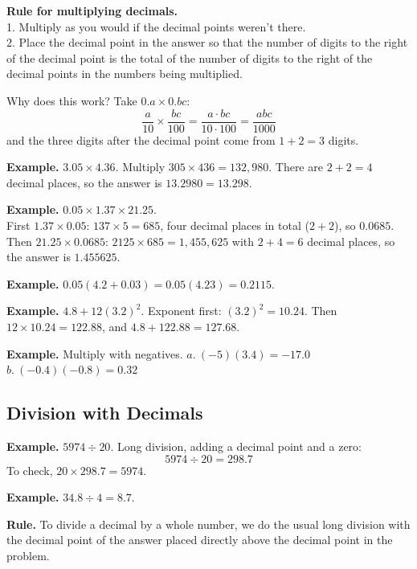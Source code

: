 \documentclass[letter]{article}
\newenvironment{keybox}
  {\begin{lrbox}{\keyboxsave}\begin{minipage}{\dimexpr\linewidth-2\fboxsep-2\fboxrule\relax}}
  {\end{minipage}\end{lrbox}\par\noindent\fbox{\usebox{\keyboxsave}}\par}
\begin{document}
\begin{keybox}
\textbf{Rule for multiplying decimals.}\\
1. Multiply as you would if the decimal points weren't there.\\
2. Place the decimal point in the answer so that the number of digits to the right of the decimal point is the total of the number of digits to the right of the decimal points in the numbers being multiplied.
\end{keybox}

Why does this work? Take $0.a\times0.bc$:
\[\frac a{10}\times\frac{bc}{100}=\frac{a\cdot bc}{10\cdot100}=\frac{abc}{1000}\]
and the three digits after the decimal point come from $1+2=3$ digits.

\textbf{Example.} $3.05\times4.36$. Multiply $305\times436=132{,}980$. There are $2+2=4$ decimal places, so the answer is $13.2980=13.298$.

\textbf{Example.} $0.05\times1.37\times21.25$.\\
First $1.37\times0.05$: $137\times5=685$, four decimal places in total ($2+2$), so $0.0685$.\\
Then $21.25\times0.0685$: $2125\times685=1{,}455{,}625$ with $2+4=6$ decimal places, so the answer is $1.455625$.

\textbf{Example.} $0.05(4.2+0.03)=0.05(4.23)=0.2115$.

\textbf{Example.} $4.8+12(3.2)^2$. Exponent first: $(3.2)^2=10.24$. Then $12\times10.24=122.88$, and $4.8+122.88=127.68$.

\textbf{Example.} Multiply with negatives. $a.\ (-5)(3.4)=-17.0$\qquad $b.\ (-0.4)(-0.8)=0.32$

\subsection{Division with Decimals}

\textbf{Example.} $5974\div20$. Long division, adding a decimal point and a zero:
\[5974\div20=298.7\]
To check, $20\times298.7=5974$.

\textbf{Example.} $34.8\div4=8.7$.

\begin{keybox}
\textbf{Rule.} To divide a decimal by a whole number, we do the usual long division with the decimal point of the answer placed directly above the decimal point in the problem.
\end{keybox}
\end{document}
